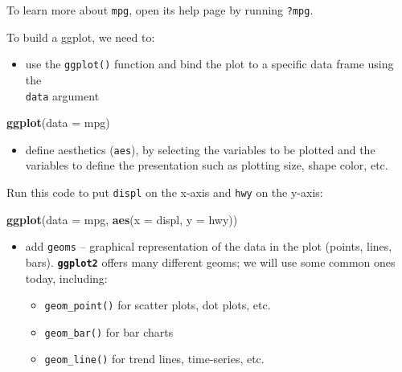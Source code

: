 \documentclass[]{book}
\newenvironment{Shaded}{\begin{snugshade}}{\end{snugshade}}
\newcommand{\KeywordTok}[1]{\textcolor[rgb]{0.13,0.29,0.53}{\textbf{#1}}}
\newcommand{\DataTypeTok}[1]{\textcolor[rgb]{0.13,0.29,0.53}{#1}}
\newcommand{\NormalTok}[1]{#1}
\providecommand{\tightlist}{%
  \setlength{\itemsep}{0pt}\setlength{\parskip}{0pt}}
\theoremstyle{definition}
\theoremstyle{definition}
\theoremstyle{definition}
\theoremstyle{remark}
\begin{document}
To learn more about \texttt{mpg}, open its help page by running
\texttt{?mpg}.

To build a ggplot, we need to:

\begin{itemize}
\tightlist
\item
  use the \texttt{ggplot()} function and bind the plot to a specific
  data frame using the\\
  \texttt{data} argument
\end{itemize}

\begin{Shaded}
\begin{Highlighting}[]
\KeywordTok{ggplot}\NormalTok{(}\DataTypeTok{data =}\NormalTok{ mpg)}
\end{Highlighting}
\end{Shaded}

\begin{itemize}
\tightlist
\item
  define aesthetics (\texttt{aes}), by selecting the variables to be
  plotted and the\\
  variables to define the presentation such as plotting size, shape
  color, etc.
\end{itemize}

Run this code to put \texttt{displ} on the x-axis and \texttt{hwy} on
the y-axis:

\begin{Shaded}
\begin{Highlighting}[]
\KeywordTok{ggplot}\NormalTok{(}\DataTypeTok{data =}\NormalTok{ mpg, }\KeywordTok{aes}\NormalTok{(}\DataTypeTok{x =}\NormalTok{ displ, }\DataTypeTok{y =}\NormalTok{ hwy))}
\end{Highlighting}
\end{Shaded}

\begin{itemize}
\tightlist
\item
  add \texttt{geoms} -- graphical representation of the data in the plot
  (points, lines, bars). \textbf{\texttt{ggplot2}} offers many different
  geoms; we will use some common ones today, including:

  \begin{itemize}
  \tightlist
  \item
    \texttt{geom\_point()} for scatter plots, dot plots, etc.
  \item
    \texttt{geom\_bar()} for bar charts
  \item
    \texttt{geom\_line()} for trend lines, time-series, etc.
  \end{itemize}
\end{itemize}
\end{document}

